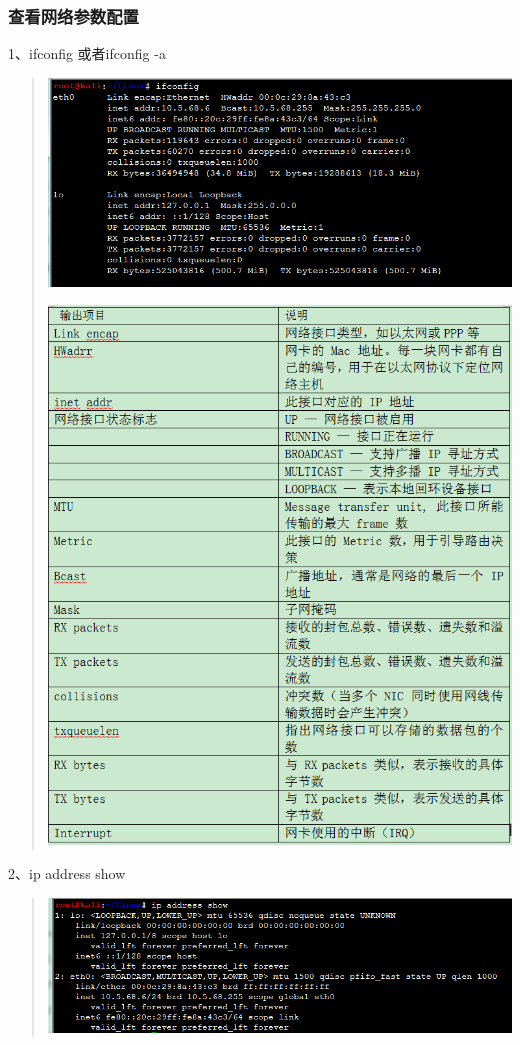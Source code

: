 \documentclass[letterpaper,10pt]{sphinxmanual}
\begin{document}
\subsubsection{查看网络参数配置}
\label{Linux_net/ip:id4}
1、ifconfig 或者ifconfig -a
\begin{quote}

\includegraphics{ifconfig.png}

\includegraphics{ifconfig-info.png}
\end{quote}

2、ip address show
\begin{quote}

\includegraphics{address-show.png}
\end{quote}
\end{document}
